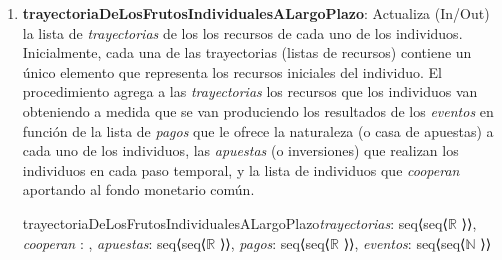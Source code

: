 \documentclass[10pt,a4paper]{article}
\begin{document}
\begin{enumerate}

    \item \textbf{trayectoriaDeLosFrutosIndividualesALargoPlazo}: Actualiza (In/Out) la lista de \textit{trayectorias} de los los recursos de cada uno de los individuos. Inicialmente, cada una de las trayectorias (listas de recursos) contiene un único elemento que representa los recursos iniciales del individuo. El procedimiento agrega a las \textit{trayectorias} los recursos que los individuos van obteniendo a medida que se van produciendo los resultados de los \textit{eventos} en función de la lista de \textit{pagos} que le ofrece la naturaleza (o casa de apuestas) a cada uno de los individuos, las \textit{apuestas} (o inversiones) que realizan los individuos en cada paso temporal, y la lista de individuos que \textit{cooperan} aportando al fondo monetario común.
    
    \begin{proc}{trayectoriaDeLosFrutosIndividualesALargoPlazo}{\Inout \textit{trayectorias}:
        seq⟨seq⟨$%
        \mathbb{R}
        $%
        ⟩⟩, \In \textit{cooperan} : , \In \textit{apuestas}:
        seq⟨seq⟨$%
        \mathbb{R}
        $%
        ⟩⟩, \In \textit{pagos}:
        seq⟨seq⟨$%
        \mathbb{R}
        $%
        ⟩⟩, \In \textit{eventos}:
        seq⟨seq⟨$%
        \mathbb{N}
        $%
        ⟩⟩}
    {}
        \requiere{}

        \asegura{}

    \end{proc}


\end{enumerate}
\end{document}
